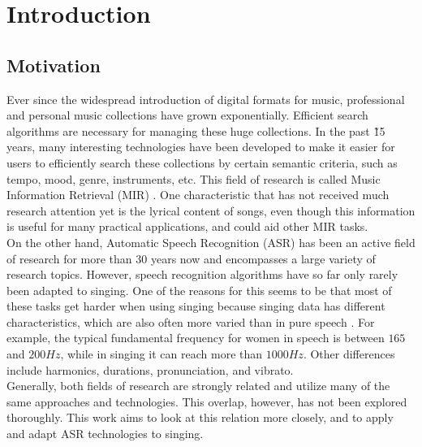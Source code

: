 \chapter{Introduction} \label{chap:introduction}
\section{Motivation}

Ever since the widespread introduction of digital formats for music, professional and personal music collections have grown exponentially. Efficient search algorithms are necessary for managing these huge collections. In the past \~15 years, many interesting technologies have been developed to make it easier for users to efficiently search these collections by certain semantic criteria, such as tempo, mood, genre, instruments, etc. This field of research is called Music Information Retrieval (MIR) \cite{incollection:mir}. One characteristic that has not received much research attention yet is the lyrical content of songs, even though this information is useful for many practical applications, and could aid other MIR tasks.\\

On the other hand, Automatic Speech Recognition (ASR) has been an active field of research for more than 30 years now and encompasses a large variety of research topics. However, speech recognition algorithms have so far only rarely been adapted to singing. One of the reasons for this seems to be that most of these tasks get harder when using singing because singing data has different characteristics, which are also often more varied than in pure speech \cite{loscos}. For example, the typical fundamental frequency for women in speech is between $165$ and $200 Hz$, while in singing it can reach more than $1000 Hz$. Other differences include harmonics, durations, pronunciation, and vibrato.\\

Generally, both fields of research are strongly related and utilize many of the same approaches and technologies. This overlap, however, has not been explored thoroughly. This work aims to look at this relation more closely, and to apply and adapt ASR technologies to singing.\\


